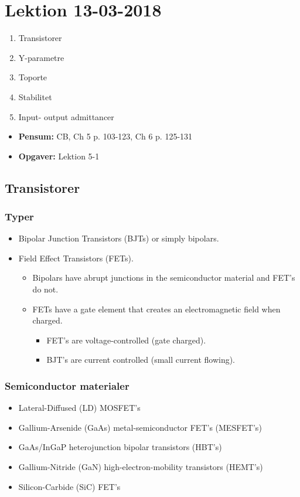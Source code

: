 \section{Lektion 13-03-2018}

\begin{enumerate}
	\item Transistorer
	\item Y-parametre
	\item Toporte
	\item Stabilitet
	\item Input- output admittancer
\end{enumerate}

\begin{mdframed}[style=exampledefault]
	\begin{itemize}
		\item \textbf{Pensum:} CB, Ch 5 p. 103-123, Ch 6 p. 125-131
		\item \textbf{Opgaver:} Lektion 5-1
	\end{itemize}
\end{mdframed}

\subsection{Transistorer}
\subsubsection{Typer}
\begin{itemize}
	\item Bipolar Junction Transistors (BJTs) or simply bipolars.
	\item Field Effect Transistors (FETs). 
	\begin{itemize}
		\item Bipolars have abrupt junctions in the semiconductor material and
		FET's do not.
		\item FETs have a gate element that creates an electromagnetic field when charged.
		\begin{itemize}
			\item FET's are voltage-controlled (gate charged).
			\item BJT's are current controlled (small current flowing).
		\end{itemize}
	\end{itemize}
\end{itemize}

\subsubsection{Semiconductor materialer}
\begin{itemize}
	\item Lateral-Diffused (LD) MOSFET's
	\item Gallium-Arsenide (GaAs) metal-semiconductor FET's (MESFET's)
	\item GaAs/InGaP heterojunction	bipolar transistors (HBT's)
	\item Gallium-Nitride (GaN)	high-electron-mobility transistors (HEMT's)
	\item Silicon-Carbide (SiC) FET's
\end{itemize}


